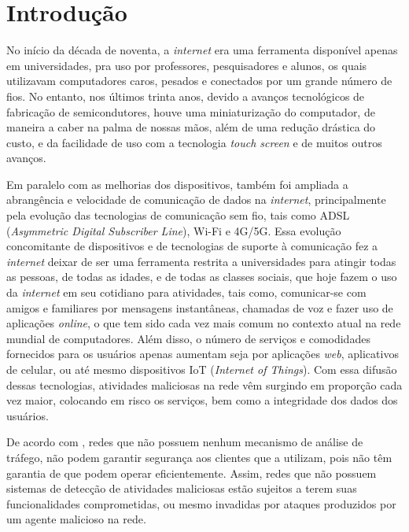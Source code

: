 \chapter[Introdução]{Introdução}
\label{introducao}
No início da década de noventa, a \textit{internet} era uma ferramenta disponível apenas em universidades, pra uso por professores, pesquisadores e alunos, os quais utilizavam computadores caros, pesados e conectados por um grande número de fios. No entanto, nos últimos trinta anos, devido a avanços tecnológicos de fabricação de semicondutores, houve uma miniaturização do computador, de maneira a caber na palma de nossas mãos, além de uma redução drástica do custo, e da facilidade de uso com a tecnologia \textit{touch screen} e de muitos outros avanços. 

Em paralelo com as melhorias dos dispositivos, também foi ampliada a abrangência e velocidade de comunicação de dados na \textit{internet}, principalmente pela evolução das tecnologias de comunicação sem fio, tais como ADSL (\textit{Asymmetric Digital Subscriber Line}), Wi-Fi e 4G/5G. Essa evolução concomitante de dispositivos e de tecnologias de suporte à comunicação fez a \textit{internet} deixar de ser uma ferramenta restrita a universidades para atingir todas as pessoas, de todas as idades, e de todas as classes sociais, que hoje fazem o uso da \textit{internet} em seu cotidiano para atividades, tais como, comunicar-se com amigos e familiares por mensagens instantâneas, chamadas de voz e fazer uso de aplicações \textit{online}, o que tem sido cada vez mais comum no contexto atual na rede mundial de computadores. Além disso, o número de serviços e comodidades fornecidos para os usuários apenas aumentam seja por aplicações \textit{web}, aplicativos de celular, ou até mesmo dispositivos IoT (\textit{Internet of Things}). Com essa difusão dessas tecnologias, atividades maliciosas na rede vêm surgindo em proporção cada vez maior, colocando em risco os serviços, bem como a integridade dos dados dos usuários. 

De acordo com , redes que não possuem nenhum mecanismo de análise de tráfego, não podem garantir segurança aos clientes que a utilizam, pois não têm garantia de que podem operar eficientemente. Assim, redes que não possuem sistemas de detecção de atividades maliciosas estão sujeitos a terem suas funcionalidades comprometidas, ou mesmo invadidas por ataques produzidos por um agente malicioso na rede.

